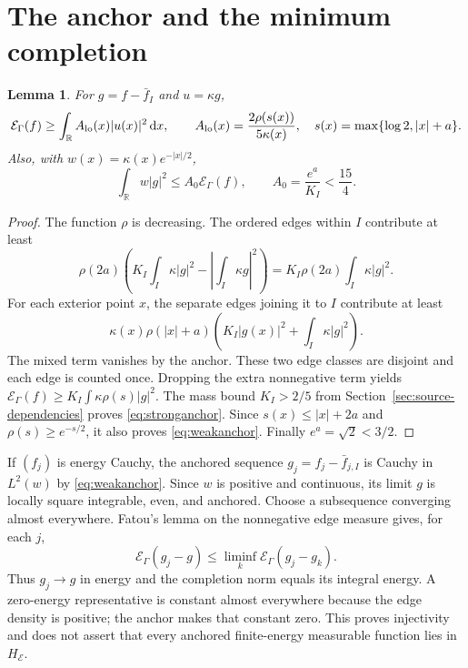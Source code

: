 \documentclass[11pt]{article}
\newtheorem{lemma}[theorem]{Lemma}
\theoremstyle{remark}\newtheorem{remark}[theorem]{Remark}
\newcommand{\R}{\mathbb R}
\newcommand{\E}{\mathcal E}
\newcommand{\dd}{\,\mathrm d}
\numberwithin{equation}{section}
\begin{document}
\section{The anchor and the minimum completion}\label{sec:anchor}
\begin{lemma}\label{lem:anchor}
For $g=f-\bar f_I$ and $u=\kappa g$,
\begin{equation}\label{eq:stronganchor}
 \E_\Gamma(f)\ge\int_\R A_{\rm lo}(x)|u(x)|^2\dd x,
 \qquad A_{\rm lo}(x)=\frac{2\rho(s(x))}{5\kappa(x)},\quad
 s(x)=\max\{\log2,|x|+a\}.
\end{equation}
Also, with $w(x)=\kappa(x)e^{-|x|/2}$,
\begin{equation}\label{eq:weakanchor}
 \int_\R w|g|^2\le A_0\E_\Gamma(f),\qquad
 A_0=\frac{e^a}{K_I}<\frac{15}{4}.
\end{equation}
\end{lemma}
\begin{proof}
The function $\rho$ is decreasing. The ordered edges within $I$ contribute at least
\[
 \rho(2a)\left(K_I\int_I\kappa|g|^2-
                         \left|\int_I\kappa g\right|^2\right)
 =K_I\rho(2a)\int_I\kappa|g|^2.
\]
For each exterior point $x$, the separate edges joining it to $I$ contribute at least
\[
 \kappa(x)\rho(|x|+a)
 \left(K_I|g(x)|^2+\int_I\kappa|g|^2\right).
\]
The mixed term vanishes by the anchor. These two edge classes are disjoint and each edge is counted once. Dropping the extra nonnegative term yields
$\E_\Gamma(f)\ge K_I\int\kappa\rho(s)|g|^2$.
The mass bound $K_I>2/5$ from Section~\ref{sec:source-dependencies} proves
\eqref{eq:stronganchor}. Since
$s(x)\le|x|+2a$ and $\rho(s)\ge e^{-s/2}$, it also proves
\eqref{eq:weakanchor}. Finally $e^a=\sqrt2<3/2$.
\end{proof}

If $(f_j)$ is energy Cauchy, the anchored sequence $g_j=f_j-\bar f_{j,I}$ is Cauchy in $L^2(w)$ by \eqref{eq:weakanchor}. Since $w$ is positive and continuous, its limit $g$ is locally square integrable, even, and anchored. Choose a subsequence converging almost everywhere. Fatou's lemma on the nonnegative edge measure gives, for each $j$,
\[
 \E_\Gamma(g_j-g)\le\liminf_k\E_\Gamma(g_j-g_k).
\]
Thus $g_j\to g$ in energy and the completion norm equals its integral energy. A zero-energy representative is constant almost everywhere because the edge density is positive; the anchor makes that constant zero. This proves injectivity and does not assert that every anchored finite-energy measurable function lies in $H_\E$.
\end{document}
